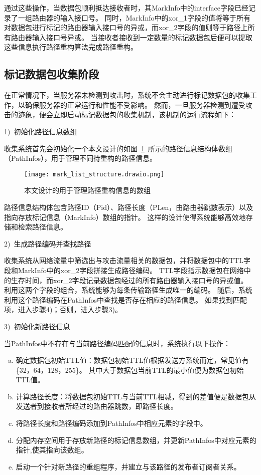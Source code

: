 通过这些操作，当数据包顺利抵达接收者时，其MarkInfo中的interface字段已经记录了一组路由器的输入接口号。
同时，MarkInfo中的xor\_1字段的值将等于所有对数据包进行标记的路由器输入接口号的异或，而xor\_2字段的值则等于路径上所有路由器输入接口号异或。
当接收者接收到一定数量的标记数据包后便可以提取这些信息执行路径重构算法完成路径重构。
\subsection{标记数据包收集阶段}
在正常情况下，当服务器未检测到攻击时，系统不会主动进行标记数据包的收集工作，以确保服务器的正常运行和性能不受影响。
然而，一旦服务器检测到遭受攻击的迹象，便会立即启动标记数据包的收集机制，该机制的运行流程如下：\par

1)~初始化路径信息数组\par
收集系统首先会初始化一个本文设计的如图~\ref{fig:markinfo_list}~所示的路径信息结构体数组（PathInfos），用于管理不同待重构的路径信息。
\begin{figure}[h]
	\centering
	\texttt{[image: mark\_list\_structure.drawio.png]}
	\caption{本文设计的用于管理路径重构信息的数组}
	\label{fig:markinfo_list}
\end{figure}
路径信息结构体包含路径ID（Pid）、路径长度（PLen，由路由器跳数表示）以及指向存放标记信息（MarkInfo）数组的指针。
这样的设计使得系统能够高效地存储和检索路径信息。\par

2)~生成路径编码并查找路径\par
收集系统从网络流量中筛选出与攻击流量相关的数据包，并将数据包中的TTL字段和MarkInfo中的xor\_2字段拼接生成路径编码。
TTL字段指示数据包在网络中的生存时间，而xor\_2字段记录数据包经过的所有路由器输入接口号的异或值。
利用这两个字段的组合，系统能够为每条传输路径生成唯一的编码。
随后，系统利用这个路径编码在PathInfos中查找是否存在相应的路径信息。
如果找到匹配项，进入步骤4)；否则，进入步骤3)。\par

3)~初始化新路径信息\par
当PathInfos中不存在与当前路径编码匹配的信息时，系统执行以下操作：
\begin{enumerate}[a.]
	\item 确定数据包初始TTL值：数据包初始TTL值根据发送方系统而定，常见值有\{32，64，128，255\}\cite{liu2007dynamic}。 其中大于数据包当前TTL的最小值便为数据包初始TTL值。 
	\item 计算路径长度：将数据包初始TTL与当前TTL相减，得到的差值便是数据包从发送者到接收者所经过的路由器跳数，即路径长度。
	\item 将路径长度和路径编码添加到PathInfos中相应元素的字段中。
	\item 分配内存空间用于存放新路径的标记信息数组，并更新PathInfos中对应元素的指针,使其指向该数组。
	\item 启动一个针对新路径的重组程序，并建立与该路径的发布者订阅者关系。
\end{enumerate}
\par

